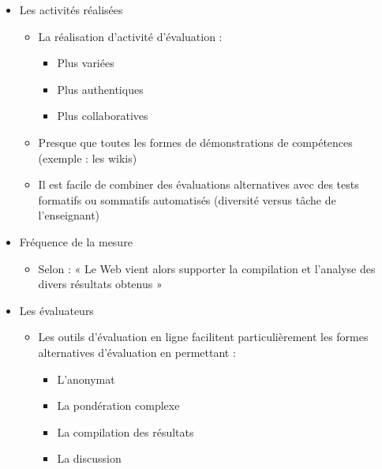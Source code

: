 \documentclass[aspectratio=169]{beamer}
\begin{document}
\begin{frame}[allowframebreaks]
\begin {itemize}
\begin {itemize}
\begin {itemize}
									\item L'automatisation
									\item La remise immédiate à l'apprenant
									\item La réutilisation
								\end{itemize}
							\item Elle permet aussi de rendre l'évaluation plus captivante parce qu'elle permet d'y insérer des éléments multimédias ou des hyperliens.
						\end{itemize}
					\framebreak 
					\item Les activités réalisées
						\begin {itemize}
							\item La réalisation d'activité d'évaluation :
								\begin {itemize}
									\item Plus variées
									\item Plus authentiques
									\item Plus collaboratives
								\end{itemize}
							\item Presque que toutes les formes de démonstrations de compétences (exemple : les wikis)
							\item Il est facile de combiner des évaluations alternatives avec des tests formatifs ou sommatifs automatisés (diversité versus tâche de l'enseignant)										
						\end{itemize}
					\framebreak 
					\item Fréquence de la mesure
						\begin {itemize}
							\item Selon \citet{audet2011a} : « Le Web vient alors supporter la compilation et l'analyse des divers résultats obtenus »
						\end{itemize}
					\framebreak 
					\item Les évaluateurs
						\begin {itemize}
							\item Les outils d'évaluation en ligne facilitent particulièrement les formes alternatives d'évaluation en permettant :
								\begin {itemize}
									\item L'anonymat
									\item La pondération complexe
									\item La compilation des résultats
									\item La discussion

\end{itemize}
\end{itemize}
\end{itemize}
\end{frame}
\end{document}
